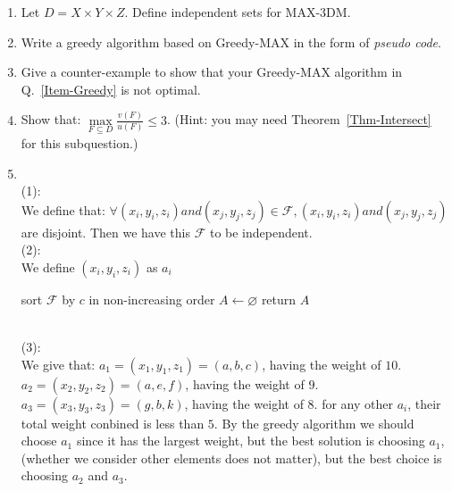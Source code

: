 \documentclass[12pt,a4paper]{article}
\makeatletter
\newtheorem*{solution}{Solution}
\theoremstyle{definition}
\renewenvironment{solution}[1][Solution] {\par\pushQED{\qed}\normalfont\topsep6\p@\@plus6\p@\relax\trivlist\item[\hskip\labelsep\bfseries#1\@addpunct{.}]\ignorespaces}{\popQED\endtrivlist\@endpefalse} \makeatother
\makeatother
\begin{document}
\begin{enumerate}
    \begin{enumerate}
    	\item Let $D = X \times Y \times Z$. Define independent sets for MAX-3DM.
    	\item Write a greedy algorithm based on Greedy-MAX in the form of \emph{pseudo code}. \label{Item-Greedy}
    	\item Give a counter-example to show that your Greedy-MAX algorithm in Q.~\ref{Item-Greedy} is not optimal.
    	\item Show that: $\max\limits_{F \subseteq D} \frac{v(F)}{u(F)} \leq 3$. {\color{blue}(Hint: you may need Theorem~\ref{Thm-Intersect} for this subquestion.)} 
    	    \begin{solution}
    	        \\(1):\\
    	        We define that: $\forall \left(x_i,y_i,z_i\right) and \left(x_j,y_j,z_j\right) \in \mathcal{F}, \left(x_i,y_i,z_i\right) and \left(x_j,y_j,z_j\right) $ are disjoint. Then we have this $\mathcal{F}$ to be independent.
    	        \\(2):\\
    	We define $\left(x_i,y_i,z_i\right)$ as $a_i$\\
    	\begin{algorithm}[H]
		
		\BlankLine
		\caption{}\label{Algorithm}
        sort $\mathcal{F}$ by $c$ in non-increasing order\;
        $A \leftarrow \varnothing$\;
        return $A$
        
            		
		
		
		
	    \end{algorithm}
    	        
    	        \\(3):\\
    	        We give that: 
    	        $a_1 = \left(x_1,y_1,z_1\right) = \left(a,b,c\right)$, having the weight of $10$.
    	        $a_2 = \left(x_2,y_2,z_2\right) = \left(a,e,f\right)$, having the weight of $9$.
    	        $a_3 = \left(x_3,y_3,z_3\right) = \left(g,b,k\right)$, having the weight of $8$.
    	        for any other $a_i$, their total weight conbined is less than $5$. By the greedy algorithm we should choose $a_1$ since it has the largest weight, but the best solution is choosing $a_1$, (whether we consider other elements does not matter), but the best choice is choosing $a_2$ and $a_3$.
    	        

\end{solution}
\end{enumerate}
\end{enumerate}
\end{document}
